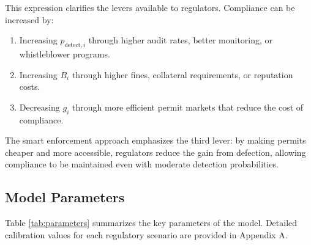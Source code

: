 This expression clarifies the levers available to regulators. Compliance can be increased by:

\begin{enumerate}
    \item Increasing $p_{\mathrm{detect},i}$ through higher audit rates, better monitoring, or whistleblower programs.
    \item Increasing $B_i$ through higher fines, collateral requirements, or reputation costs.
    \item Decreasing $g_i$ through more efficient permit markets that reduce the cost of compliance.
\end{enumerate}

The smart enforcement approach emphasizes the third lever: by making permits cheaper and more accessible, regulators reduce the gain from defection, allowing compliance to be maintained even with moderate detection probabilities.

\subsection{Model Parameters}

Table \ref{tab:parameters} summarizes the key parameters of the model. Detailed calibration values for each regulatory scenario are provided in Appendix A.


